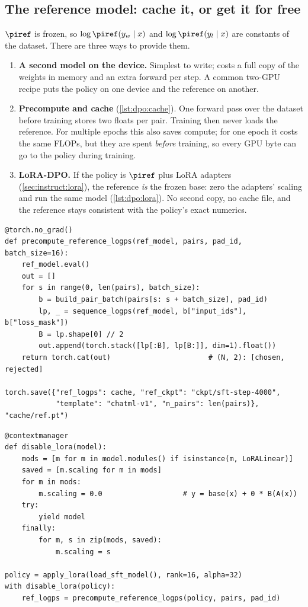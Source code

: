 \subsection{The reference model: cache it, or get it for free}\label{sec:dpo:ref}

$\piref$ is frozen, so $\log\piref(y_w\mid x)$ and $\log\piref(y_l\mid x)$ are constants of the
dataset. There are three ways to provide them.
\begin{enumerate}
\item \textbf{A second model on the device.} Simplest to write; costs a full copy of the weights in
  memory and an extra forward per step. A common two-GPU recipe puts the policy on one device and
  the reference on another.
\item \textbf{Precompute and cache} (\cref{lst:dpo:cache}). One forward pass over the dataset before
  training stores two floats per pair. Training then never loads the reference. For multiple
  epochs this also saves compute; for one epoch it costs the same FLOPs, but they are spent
  \emph{before} training, so every GPU byte can go to the policy during training.
\item \textbf{LoRA-DPO.} If the policy is $\piref$ plus LoRA adapters (\cref{sec:instruct:lora}),
  the reference \emph{is} the frozen base: zero the adapters' scaling and run the same model
  (\cref{lst:dpo:lora}). No second copy, no cache file, and the reference stays consistent with the
  policy's exact numerics.
\end{enumerate}

\begin{lstlisting}[caption={Caching reference log-probs (abridged). The optional third column stores KTO's mismatched-pair term (\cref{sec:dpo:family}).},label={lst:dpo:cache}]
@torch.no_grad()
def precompute_reference_logps(ref_model, pairs, pad_id, batch_size=16):
    ref_model.eval()
    out = []
    for s in range(0, len(pairs), batch_size):
        b = build_pair_batch(pairs[s: s + batch_size], pad_id)
        lp, _ = sequence_logps(ref_model, b["input_ids"], b["loss_mask"])
        B = lp.shape[0] // 2
        out.append(torch.stack([lp[:B], lp[B:]], dim=1).float())
    return torch.cat(out)                       # (N, 2): [chosen, rejected]

torch.save({"ref_logps": cache, "ref_ckpt": "ckpt/sft-step-4000",
            "template": "chatml-v1", "n_pairs": len(pairs)}, "cache/ref.pt")
\end{lstlisting}

\begin{lstlisting}[caption={LoRA-DPO: the base weights are the reference model.},label={lst:dpo:lora}]
@contextmanager
def disable_lora(model):
    mods = [m for m in model.modules() if isinstance(m, LoRALinear)]
    saved = [m.scaling for m in mods]
    for m in mods:
        m.scaling = 0.0                   # y = base(x) + 0 * B(A(x))
    try:
        yield model
    finally:
        for m, s in zip(mods, saved):
            m.scaling = s

policy = apply_lora(load_sft_model(), rank=16, alpha=32)
with disable_lora(policy):
    ref_logps = precompute_reference_logps(policy, pairs, pad_id)
\end{lstlisting}

